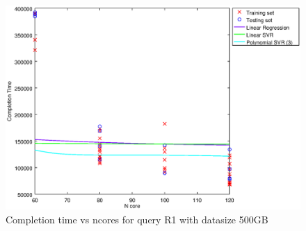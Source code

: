 
\begin {figure}[hbtp]
\centering
\includegraphics[width=\textwidth]{output/R1_500_1_OVER_NCORES/plot_R1_500_bestmodels.eps}
\caption{Completion time vs ncores for query R1 with datasize 500GB}
\label{fig:all_nonlinear_R1_500}
\end {figure}
